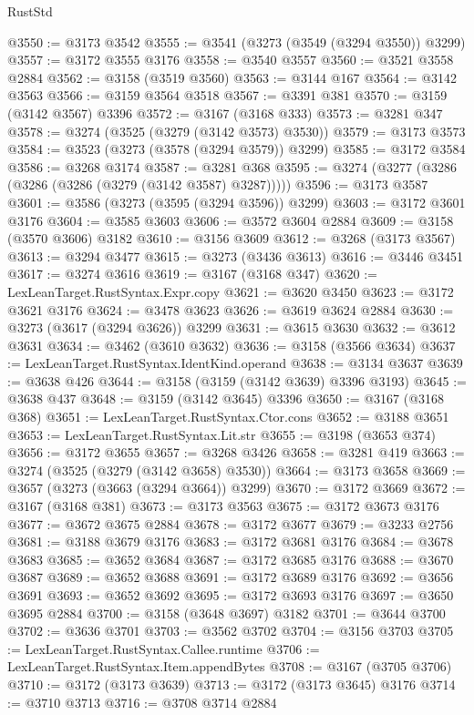 \begin{lexlean}{RustStd}
\begin{coremodule}
@3550 := @3173 @3542
@3555 := @3541 (@3273 (@3549 (@3294 @3550)) @3299)
@3557 := @3172 @3555 @3176
@3558 := @3540 @3557
@3560 := @3521 @3558 @2884
@3562 := @3158 (@3519 @3560)
@3563 := @3144 @167
@3564 := @3142 @3563
@3566 := @3159 @3564 @3518
@3567 := @3391 @381
@3570 := @3159 (@3142 @3567) @3396
@3572 := @3167 (@3168 @333)
@3573 := @3281 @347
@3578 := @3274 (@3525 (@3279 (@3142 @3573) @3530))
@3579 := @3173 @3573
@3584 := @3523 (@3273 (@3578 (@3294 @3579)) @3299)
@3585 := @3172 @3584
@3586 := @3268 @3174
@3587 := @3281 @368
@3595 := @3274 (@3277 (@3286 (@3286 (@3286 (@3279 (@3142 @3587) @3287)))))
@3596 := @3173 @3587
@3601 := @3586 (@3273 (@3595 (@3294 @3596)) @3299)
@3603 := @3172 @3601 @3176
@3604 := @3585 @3603
@3606 := @3572 @3604 @2884
@3609 := @3158 (@3570 @3606) @3182
@3610 := @3156 @3609
@3612 := @3268 (@3173 @3567)
@3613 := @3294 @3477
@3615 := @3273 (@3436 @3613)
@3616 := @3446 @3451
@3617 := @3274 @3616
@3619 := @3167 (@3168 @347)
@3620 := LexLeanTarget.RustSyntax.Expr.copy
@3621 := @3620 @3450
@3623 := @3172 @3621 @3176
@3624 := @3478 @3623
@3626 := @3619 @3624 @2884
@3630 := @3273 (@3617 (@3294 @3626)) @3299
@3631 := @3615 @3630
@3632 := @3612 @3631
@3634 := @3462 (@3610 @3632)
@3636 := @3158 (@3566 @3634)
@3637 := LexLeanTarget.RustSyntax.IdentKind.operand
@3638 := @3134 @3637
@3639 := @3638 @426
@3644 := @3158 (@3159 (@3142 @3639) @3396 @3193)
@3645 := @3638 @437
@3648 := @3159 (@3142 @3645) @3396
@3650 := @3167 (@3168 @368)
@3651 := LexLeanTarget.RustSyntax.Ctor.cons
@3652 := @3188 @3651
@3653 := LexLeanTarget.RustSyntax.Lit.str
@3655 := @3198 (@3653 @374)
@3656 := @3172 @3655
@3657 := @3268 @3426
@3658 := @3281 @419
@3663 := @3274 (@3525 (@3279 (@3142 @3658) @3530))
@3664 := @3173 @3658
@3669 := @3657 (@3273 (@3663 (@3294 @3664)) @3299)
@3670 := @3172 @3669
@3672 := @3167 (@3168 @381)
@3673 := @3173 @3563
@3675 := @3172 @3673 @3176
@3677 := @3672 @3675 @2884
@3678 := @3172 @3677
@3679 := @3233 @2756
@3681 := @3188 @3679 @3176
@3683 := @3172 @3681 @3176
@3684 := @3678 @3683
@3685 := @3652 @3684
@3687 := @3172 @3685 @3176
@3688 := @3670 @3687
@3689 := @3652 @3688
@3691 := @3172 @3689 @3176
@3692 := @3656 @3691
@3693 := @3652 @3692
@3695 := @3172 @3693 @3176
@3697 := @3650 @3695 @2884
@3700 := @3158 (@3648 @3697) @3182
@3701 := @3644 @3700
@3702 := @3636 @3701
@3703 := @3562 @3702
@3704 := @3156 @3703
@3705 := LexLeanTarget.RustSyntax.Callee.runtime
@3706 := LexLeanTarget.RustSyntax.Item.appendBytes
@3708 := @3167 (@3705 @3706)
@3710 := @3172 (@3173 @3639)
@3713 := @3172 (@3173 @3645) @3176
@3714 := @3710 @3713
@3716 := @3708 @3714 @2884

\end{coremodule}
\end{lexlean}
